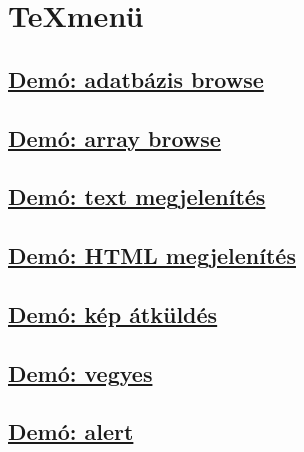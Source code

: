 
\section*{\TeX menü}
\hrulefill
\subsection*{\href{/jtconnect/localhost/46001/ssl}{Demó: adatbázis browse}}
\subsection*{\href{/jtconnect/localhost/46002}{Demó: array browse}}
\subsection*{\href{/jtconnect/localhost/46003}{Demó: text megjelenítés}}
\subsection*{\href{/jtconnect/localhost/46004}{Demó: HTML megjelenítés}}
\subsection*{\href{/jtconnect/localhost/46005}{Demó: kép átküldés}}
\subsection*{\href{/jtconnect/localhost/46006/ssl}{Demó: vegyes}}
\subsection*{\href{/jtconnect/localhost/46007/ssl}{Demó: alert}}
\hrulefill

